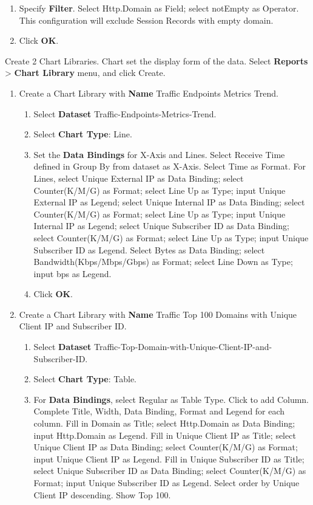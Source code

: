 \begin{description}
\begin{enumerate}
\begin{enumerate}
\begin{enumerate}
            \end{enumerate}
            \item	Specify \textbf{Filter}. Select Http.Domain as Field; select notEmpty as Operator. This configuration will exclude Session Records with empty domain. 
            \item	Click \textbf{OK}.
        \end{enumerate}
    \end{enumerate}
    \item[STEP 2.]	Create 2 Chart Libraries. Chart set the display form of the data. Select \textbf{Reports} > \textbf{Chart Library} menu, and click Create.
    \begin{enumerate}
        \item Create a Chart Library with \textbf{Name} Traffic Endpoints Metrics Trend.
        \begin{enumerate}
            \item 	Select \textbf{Dataset} Traffic-Endpoints-Metrics-Trend.
            \item 	Select \textbf{Chart Type}: Line.
            \item 	Set the \textbf{Data Bindings} for X-Axis and Lines. Select Receive Time defined in Group By from dataset as X-Axis. Select Time as Format. For Lines, select Unique External IP as Data Binding; select Counter(K/M/G) as Format; select Line Up as Type; input Unique External IP as Legend; select Unique Internal IP as Data Binding; select Counter(K/M/G) as Format; select Line Up as Type; input Unique Internal IP as Legend; select Unique Subscriber ID as Data Binding; select Counter(K/M/G) as Format; select Line Up as Type; input Unique Subscriber ID as Legend. Select Bytes as Data Binding; select Bandwidth(Kbps/Mbps/Gbps) as Format; select Line Down as Type; input bps as Legend.
            \item 	Click \textbf{OK}.
        \end{enumerate}
        \item Create a Chart Library with \textbf{Name} Traffic Top 100 Domains with Unique Client IP and Subscriber ID.
        \begin{enumerate}
            \item 	Select \textbf{Dataset} Traffic-Top-Domain-with-Unique-Client-IP-and-Subscriber-ID.
            \item 	Select \textbf{Chart Type}: Table.
            \item 	For \textbf{Data Bindings}, select Regular as Table Type. Click to add Column. Complete Title, Width, Data Binding, Format and Legend for each column. Fill in Domain as Title; select Http.Domain as Data Binding; input Http.Domain as Legend. Fill in Unique Client IP as Title; select Unique Client IP as Data Binding; select Counter(K/M/G) as Format; input Unique Client IP as Legend. Fill in Unique Subscriber ID as Title; select Unique Subscriber ID as Data Binding; select Counter(K/M/G) as Format; input Unique Subscriber ID as Legend. Select order by Unique Client IP descending. Show Top 100.

\end{enumerate}
\end{enumerate}
\end{description}
